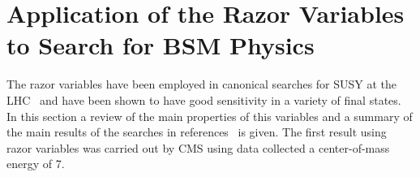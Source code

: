\section{Application of the Razor Variables to Search for BSM Physics}\label{razorApp}

The razor variables have been employed in canonical searches for SUSY
at the LHC~\cite{razor7TeV,razor8TeV,razor13TeV} and have been shown to have good sensitivity in a variety
of final states. In this section a review of the main properties of
this variables and a summary of the main results of the searches in
references~\cite{razor7TeV,razor8TeV,razor13TeV} is given. The first
result using razor variables was carried out by CMS using data
collected a center-of-mass energy of 7\TeV.